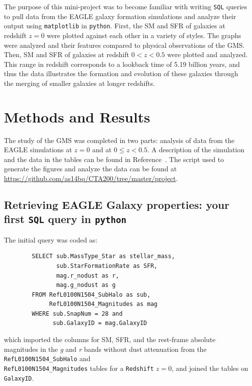 \documentclass[12pt]{article}
\begin{document}
The purpose of this mini-project was to become familiar with writing {\tt SQL} queries to pull data from the EAGLE galaxy formation simulations and analyze their output using {\tt matplotlib} in {\tt python}.  First, the SM and SFR of galaxies at redshift $z=0$ were plotted against each other in a variety of styles.  The graphs were analyzed and their features compared to physical observations of the GMS.  Then, SM and SFR of galaxies at redshift $0<z<0.5$ were plotted and analyzed.  This range in redshift corresponds to a lookback time of 5.19 billion years, and thus the data illustrates the formation and evolution of these galaxies through the merging of smaller galaxies at longer redshifts.   

\section{Methods and Results}
The study of the GMS was completed in two parts: analysis of data from the EAGLE simulations at $z=0$ and at $0\leq z <0.5$.  A description of the simulation and the data in the tables can be found in Reference~\cite{EAGLE}.  The script used to generate the figures and analyze the data can be found at \url{https://github.com/as14bq/CTA200/tree/master/project}.

\subsection{Retrieving EAGLE Galaxy properties: your first {\tt SQL} query in {\tt python}}

The initial query was coded as:
\begin{verbatim}
        SELECT sub.MassType_Star as stellar_mass, 
               sub.StarFormationRate as SFR,
               mag.r_nodust as r,
               mag.g_nodust as g
        FROM RefL0100N1504_SubHalo as sub,
             RefL0100N1504_Magnitudes as mag
        WHERE sub.SnapNum = 28 and
              sub.GalaxyID = mag.GalaxyID
\end{verbatim}
which imported the columns for SM, SFR, and the rest-frame absolute magnitudes in the \textit{g} and \textit{r} bands without dust attenuation from the {\tt RefL0100N1504\_SubHalo} and \\{\tt RefL0100N1504\_Magnitudes} tables for a {\tt Redshift} $z=0$, and joined the tables on {\tt GalaxyID}.  
\end{document}
